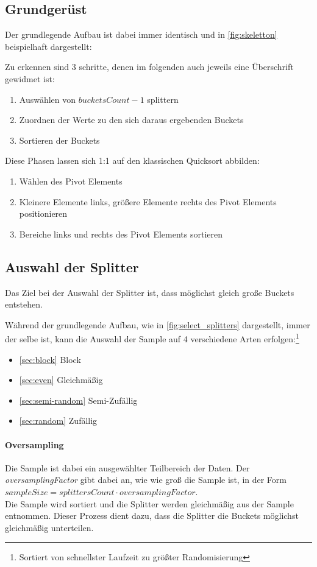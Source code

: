 	\subsection{Grundger\"ust}
		Der grundlegende Aufbau ist dabei immer identisch und in \ref{fig:skeletton} beispielhaft dargestellt:
		
		Zu erkennen sind 3 schritte, denen im folgenden auch jeweils eine Überschrift gewidmet ist:
		\begin{enumerate}
			\item Auswählen von $\textit{bucketsCount}-1$ splittern
			\item Zuordnen der Werte zu den sich daraus ergebenden Buckets
			\item Sortieren der Buckets
		\end{enumerate}
		Diese Phasen lassen sich 1:1 auf den klassischen Quicksort abbilden:
		\begin{enumerate}
			\item Wählen des Pivot Elements
			\item Kleinere Elemente links, größere Elemente rechts des Pivot Elements positionieren
			\item Bereiche links und rechts des Pivot Elements sortieren
		\end{enumerate}
		

	\subsection{Auswahl der Splitter}
		Das Ziel bei der Auswahl der Splitter ist, dass möglichst gleich große Buckets entstehen.
		
		Während der grundlegende Aufbau, wie in \ref{fig:select_splitters} dargestellt, immer der selbe ist, kann die Auswahl der Sample auf 4 verschiedene Arten erfolgen:\footnote{Sortiert von schnellster Laufzeit zu größter Randomisierung} \autocite{berlin-2007}
		\begin{itemize}
			\item \ref{sec:block} Block
			\item \ref{sec:even} Gleichmäßig
			\item \ref{sec:semi-random} Semi-Zufällig
			\item \ref{sec:random} Zufällig
		\end{itemize}
		
		\paragraph{Oversampling}
			Die Sample ist dabei ein ausgewählter Teilbereich der Daten. Der \textit{oversamplingFactor} gibt dabei an, wie wie groß die Sample ist, in der Form $\textit{sampleSize}=\textit{splittersCount}\cdot\textit{oversamplingFactor}$.\\
			Die Sample wird sortiert und die Splitter werden gleichmäßig aus der Sample entnommen.
			Dieser Prozess dient dazu, dass die Splitter die Buckets möglichst gleichmäßig unterteilen.

